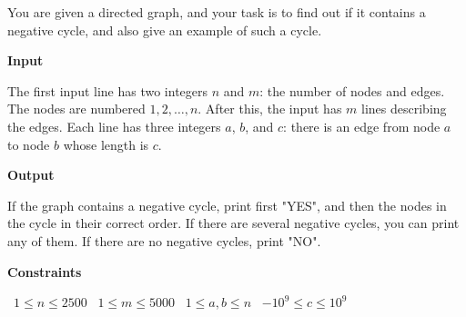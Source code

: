 You are given a directed graph, and your task is to find out if it contains a negative cycle, and also give an example of such a cycle.

\vspace{0.3cm}\noindent\textbf{Input}

The first input line has two integers $n$ and $m$: the number of nodes and edges. The nodes are numbered $1,2,\ldots,n$.
After this, the input has $m$ lines describing the edges. Each line has three integers $a$, $b$, and $c$: there is an edge from node $a$ to node $b$ whose length is $c$.

\vspace{0.3cm}\noindent\textbf{Output}

If the graph contains a negative cycle, print first "YES", and then the nodes in the cycle in their correct order. If there are several negative cycles, you can print any of them. If there are no negative cycles, print "NO".

\vspace{0.3cm}\noindent\textbf{Constraints}

\textbullet\ $1 \le n \le 2500$
\textbullet\ $1 \le m \le 5000$
\textbullet\ $1 \le a,b \le n$
\textbullet\ $-10^9 \le c \le 10^9$